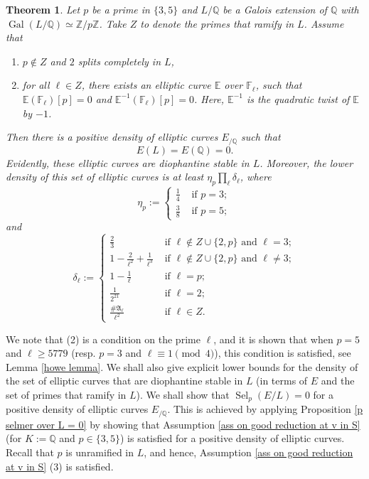 \documentclass[12pt]{amsart}
\newtheorem{theorem}{Theorem}[section]
\newcommand{\Z}{\mathbb{Z}}
\newcommand{\Q}{\mathbb{Q}}
\newcommand{\F}{\mathbb{F}}
\newcommand{\op}[1]{\operatorname{#1}}
\numberwithin{equation}{section}
\begin{document}
\begin{theorem}\label{main thm}
    Let $p$ be a prime in $\{3, 5\}$ and $L/\Q$ be a Galois extension of $\Q$ with $\op{Gal}(L/\Q)\simeq \Z/p\Z$. Take $Z$ to denote the primes that ramify in $L$. Assume that 
    \begin{enumerate}
        \item $p\notin Z$ and $2$ splits completely in $L$, 
        \item for all $\ell \in Z$, there exists an elliptic curve $\mathbb{E}$ over $\F_\ell$, such that $\mathbb{E}(\F_\ell)[p]=0$ and $\mathbb{E}^{-1}(\F_\ell)[p]=0$. Here, $\mathbb{E}^{-1}$ is the quadratic twist of $\mathbb{E}$ by $-1$. 
    \end{enumerate}
    Then there is a positive density of elliptic curves $E_{/\Q}$ such that
    \[E(L)=E(\Q)=0. \]
    Evidently, these elliptic curves are \emph{diophantine stable} in $L$. 
    Moreover, the lower density of this set of elliptic curves is at least $\eta_p \prod_\ell \delta_\ell$, where 
    \[\eta_p:=\begin{cases} \frac{1}{4} & \text{ if }p=3;\\
 \frac{3}{8} & \text{ if }p=5;\end{cases}\]
    and \[\delta_\ell:=\begin{cases}
      \frac{2}{3}  & \text{ if }\ell\notin Z\cup \{2,p\} \text{ and }\ell=3;\\
       1-\frac{2}{\ell^2}+\frac{1}{\ell^3}  & \text{ if }\ell\notin Z\cup \{2,p\} \text{ and }\ell\neq  3;\\
       1-\frac{1}{\ell} & \text{ if }\ell=p;\\
       \frac{1}{2^{21}} & \text{ if }\ell=2;\\
      \frac{\#\mathfrak{A}_\ell}{\ell^2} & \text{ if }\ell\in Z.
    \end{cases}\]
\end{theorem}

We note that (2) is a condition on the prime $\ell$, and it is shown that when $p=5$ and $\ell\geq 5779$ (resp. $p=3$ and $\ell\equiv 1\pmod{4}$), this condition is satisfied, see Lemma \ref{howe lemma}. We shall also give explicit lower bounds for the density of the set of elliptic curves that are diophantine stable in $L$ (in terms of $E$ and the set of primes that ramify in $L$). We shall show that $\op{Sel}_p(E/L)=0$ for a positive density of elliptic curves $E_{/\Q}$. This is achieved by applying Proposition \ref{p selmer over L = 0} by showing that Assumption \ref{ass on good reduction at v in S} (for $K:=\Q$ and $p\in \{3,5\}$) is satisfied for a positive density of elliptic curves. Recall that $p$ is unramified in $L$, and hence, Assumption \ref{ass on good reduction at v in S} (3) is satisfied.
\end{document}
